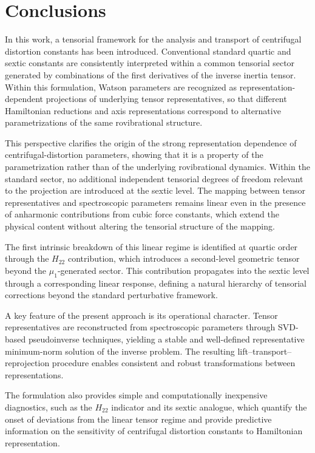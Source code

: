 \documentclass[aip,jcp,reprint,floatfix]{revtex4-2}
\begin{document}
\section{Conclusions}

In this work, a tensorial framework for the analysis and transport of
centrifugal distortion constants has been introduced. Conventional
standard quartic and sextic constants are consistently interpreted
within a common tensorial sector generated by combinations of the first
derivatives of the inverse inertia tensor. Within this formulation,
Watson parameters are recognized as representation-dependent projections
of underlying tensor representatives, so that different Hamiltonian
reductions and axis representations correspond to alternative
parametrizations of the same rovibrational structure.

This perspective clarifies the origin of the strong representation
dependence of centrifugal-distortion parameters, showing that it is a
property of the parametrization rather than of the underlying
rovibrational dynamics. Within the standard sector, no additional
independent tensorial degrees of freedom relevant to the projection are
introduced at the sextic level. The mapping between tensor
representatives and spectroscopic parameters remains linear even in the
presence of anharmonic contributions from cubic force constants, which
extend the physical content without altering the tensorial structure of
the mapping.

The first intrinsic breakdown of this linear regime is identified at
quartic order through the $H_{22}$ contribution, which introduces a
second-level geometric tensor beyond the $\mu_1$-generated sector. This
contribution propagates into the sextic level through a corresponding
linear response, defining a natural hierarchy of tensorial corrections
beyond the standard perturbative framework.

A key feature of the present approach is its operational character.
Tensor representatives are reconstructed from spectroscopic parameters
through SVD-based pseudoinverse techniques, yielding a stable and
well-defined representative minimum-norm solution of the inverse
problem. The resulting lift--transport--reprojection procedure enables
consistent and robust transformations between representations.

The formulation also provides simple and computationally inexpensive
diagnostics, such as the $H_{22}$ indicator and its sextic analogue,
which quantify the onset of deviations from the linear tensor regime
and provide predictive information on the sensitivity of centrifugal
distortion constants to Hamiltonian representation.
\end{document}
